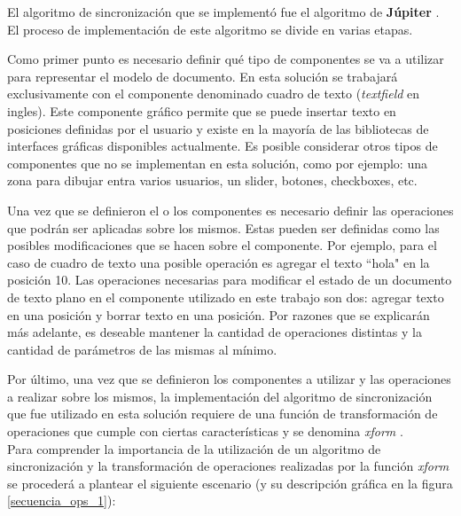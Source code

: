 \documentclass[12pt,a4paper]{article}
\begin{document}
	El algoritmo de sincronización que se implementó fue el algoritmo de \textbf{Júpiter} \cite{jupiter}. 
	El proceso de implementación de este algoritmo se divide en varias etapas.
	
	Como primer punto es necesario definir qué tipo de componentes se va a utilizar para representar el modelo
	de documento. En esta solución se trabajará exclusivamente con el componente denominado cuadro de texto
	(\textit{textfield} en ingles). Este componente gráfico permite que se puede insertar texto en 
	posiciones definidas por el usuario y existe en la mayoría de las bibliotecas de interfaces gráficas 
	disponibles actualmente. Es posible considerar otros tipos de componentes que no se implementan en esta
	solución, como por ejemplo: una zona para dibujar entra varios usuarios, un slider, botones, checkboxes, etc.
	
	Una vez que se definieron el o los componentes es necesario definir las operaciones que podrán ser aplicadas sobre
	los mismos. Estas pueden ser definidas como las posibles modificaciones que se hacen sobre el componente.
	Por ejemplo, para el caso de cuadro de texto una posible operación es agregar el texto \textsf{``hola"} 
	en la posición 10.
	Las operaciones necesarias para modificar el estado de un documento de texto plano en el componente utilizado
	en este trabajo son	dos: agregar texto en una posición y borrar texto en una posición.
	Por razones que se explicarán más adelante, es deseable mantener la cantidad de operaciones distintas y
	la cantidad de parámetros de las mismas al mínimo.

	Por último, una vez que se definieron los componentes a utilizar y las operaciones a realizar sobre los mismos,
	la implementación del algoritmo de sincronización que fue utilizado en esta solución requiere de una función 
	de transformación de operaciones que cumple con ciertas características y se denomina
	\textit{xform } \cite{jupiter}. \\

	Para comprender la importancia de la utilización de un algoritmo de sincronización y la transformación
	de operaciones realizadas por la función \textit{xform }se procederá a plantear el siguiente escenario
	(y su descripción gráfica en la figura \ref{secuencia_ops_1}):
	
\end{document}
